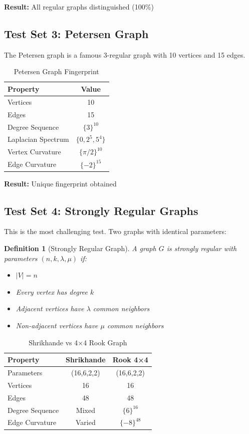 \documentclass[12pt,a4paper]{article}
\newtheorem{definition}[theorem]{Definition}
\begin{document}
\textbf{Result:} All regular graphs distinguished (100\%)

\subsection{Test Set 3: Petersen Graph}

The Petersen graph is a famous 3-regular graph with 10 vertices and 15 edges.

\begin{table}[h]
\centering
\caption{Petersen Graph Fingerprint}
\label{tab:petersen}
\begin{tabular}{lc}
\toprule
Property & Value \\
\midrule
Vertices & 10 \\
Edges & 15 \\
Degree Sequence & $\{3\}^{10}$ \\
Laplacian Spectrum & $\{0, 2^5, 5^4\}$ \\
Vertex Curvature & $\{\pi/2\}^{10}$ \\
Edge Curvature & $\{-2\}^{15}$ \\
\bottomrule
\end{tabular}
\end{table}

\textbf{Result:} Unique fingerprint obtained

\subsection{Test Set 4: Strongly Regular Graphs}

This is the most challenging test. Two graphs with identical parameters:

\begin{definition}[Strongly Regular Graph]
A graph $G$ is \textit{strongly regular} with parameters $(n,k,\lambda,\mu)$ if:
\begin{itemize}
  \item $|V| = n$
  \item Every vertex has degree $k$
  \item Adjacent vertices have $\lambda$ common neighbors
  \item Non-adjacent vertices have $\mu$ common neighbors
\end{itemize}
\end{definition}

\begin{table}[h]
\centering
\caption{Shrikhande vs 4×4 Rook Graph}
\label{tab:srg}
\begin{tabular}{lcc}
\toprule
Property & Shrikhande & Rook 4×4 \\
\midrule
Parameters & (16,6,2,2) & (16,6,2,2) \\
Vertices & 16 & 16 \\
Edges & 48 & 48 \\
Degree Sequence & Mixed & $\{6\}^{16}$ \\
Edge Curvature & Varied & $\{-8\}^{48}$ \\
\bottomrule
\end{tabular}
\end{table}
\end{document}
